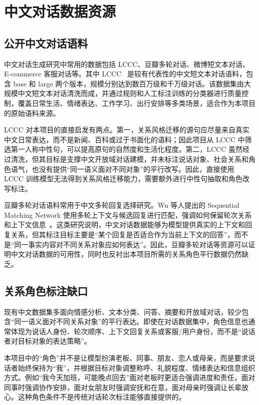 \documentclass[12pt,a4paper]{ctexart}
\begin{document}
\section{中文对话数据资源}

\subsection{公开中文对话语料}

中文对话生成研究中常用的数据包括 LCCC、豆瓣多轮对话、微博短文本对话、E-commerce 客服对话等。其中 LCCC~\cite{wang2020lccc} 是较有代表性的中文短文本对话语料，包含 base 和 large 两个版本，规模分别达到数百万级和千万级对话。该数据集由大规模中文短文本对话清洗而成，并通过规则和人工标注训练的分类器进行质量控制，覆盖日常生活、情绪表达、工作学习、出行安排等多类场景，适合作为本项目的原始语料来源。

LCCC 对本项目的直接启发有两点。第一，关系风格迁移的源句应尽量来自真实中文日常表达，而不是新闻、百科或过于书面化的语料；因此项目从 LCCC 中筛选第一人称中性句，可以提高原句的自然度和生活化程度。第二，LCCC 虽然经过清洗，但其目标是支撑中文开放域对话建模，并未标注说话对象、社会关系和角色语气，也没有提供“同一语义面对不同对象”的平行改写。因此，直接使用 LCCC 训练模型无法得到关系风格迁移能力，需要额外进行中性句抽取和角色改写标注。

豆瓣多轮对话语料常用于中文多轮回复选择研究。Wu 等人提出的 Sequential Matching Network 使用多轮上下文与候选回复进行匹配，强调如何保留轮次关系和上下文信息~\cite{wu2017smn}。这类研究说明，中文对话数据能够为模型提供真实的上下文和回复关系，但其标注目标主要是“某个回复是否适合作为当前上下文的回答”，而不是“同一事实内容对不同关系对象应如何表达”。因此，豆瓣多轮对话等资源可以证明中文对话数据的可用性，同时也反衬出本项目所需的关系角色平行数据仍然缺乏。

\subsection{关系角色标注缺口}

现有中文数据集多面向情感分析、文本分类、问答、摘要和开放域对话，较少包含“同一语义面对不同关系对象”的平行表达。即使在对话数据集中，角色信息也通常体现为说话人身份、轮次顺序、上下文回复关系或客服/用户身份，而不是“说话者对目标对象的表达策略”。

本项目中的“角色”并不是让模型扮演老板、同事、朋友、恋人或母亲，而是要求说话者始终保持为“我”，并根据目标对象调整称呼、礼貌程度、情绪表达和信息组织方式。例如“我今天加班，可能晚点回去”面对老板时更适合强调进度和责任，面对同事时强调协作安排，面对女朋友时强调安抚和在意，面对母亲时强调让长辈放心。这种角色条件不是传统对话轮次标注能够直接提供的。
\end{document}
